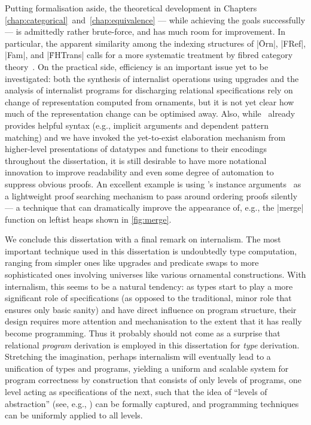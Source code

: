 Putting formalisation aside, the theoretical development in Chapters \ref{chap:categorical}~and~\ref{chap:equivalence} --- while achieving the goals successfully --- is admittedly rather brute-force, and has much room for improvement.
In particular, the apparent similarity among the indexing structures of |Ōrn|, |FRef|, |Fam|, and |ḞHTrans| calls for a more systematic treatment by fibred category theory~\citep{Jacobs-categorical-logic-and-type-theory}.
On the practical side, efficiency is an important issue yet to be investigated: both the synthesis of internalist operations using upgrades and the analysis of internalist programs for discharging relational specifications rely on change of representation computed from ornaments, but it is not yet clear how much of the representation change can be optimised away.
Also, while \Agda\ already provides helpful syntax (e.g., implicit arguments and dependent pattern matching) and we have invoked the yet-to-exist elaboration mechanism from higher-level presentations of datatypes and functions to their encodings throughout the dissertation, it is still desirable to have more notational innovation to improve readability and even some degree of automation to suppress obvious proofs.
An excellent example is  using \Agda's instance arguments~\citep{Devriese-instance-arguments} as a lightweight proof searching mechanism to pass around ordering proofs silently --- a technique that can dramatically improve the appearance of, e.g., the |merge| function on leftist heaps shown in \autoref{fig:merge}.

We conclude this dissertation with a final remark on internalism.
The most important technique used in this dissertation is undoubtedly type computation, ranging from simpler ones like upgrades and predicate swaps to more sophisticated ones involving universes like various ornamental constructions.
With internalism, this seems to be a natural tendency: as types start to play a more significant role of specifications (as opposed to the traditional, minor role that ensures only basic sanity) and have direct influence on program structure, their design requires more attention and mechanisation to the extent that it has really become programming.
Thus it probably should not come as a surprise that relational \emph{program} derivation is employed in this dissertation for \emph{type} derivation.
Stretching the imagination, perhaps internalism will eventually lead to a unification of types and programs, yielding a uniform and scalable system for program correctness by construction that consists of only levels of programs, one level acting as specifications of the next, such that the idea of ``levels of abstraction'' (see, e.g., \citet{Dijkstra-notes-on-structured-programming}) can be formally captured, and programming techniques can be uniformly applied to all levels.
